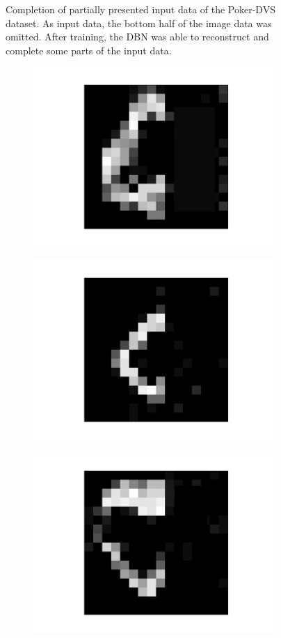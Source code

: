 \begin{figure}[h!]
\begin{subfigure}{.25\textwidth}
  		\label{fig:sub1}
	\end{subfigure}%
	\caption[Completion of partially presented input data of the Poker-DVS dataset.]{Completion of partially presented input data of the Poker-DVS dataset. As input data, the bottom half of the image data was omitted. After training, the DBN was able to reconstruct and complete some parts of the input data.}
	\label{fig:pokercompl}
\end{figure}


\begin{figure}[h!]
	\centering
	\begin{subfigure}{.25\textwidth}
  		\centering
  		\includegraphics[width=.6\linewidth]{imgs/poker/compl13.png}
  		\label{fig:sub1}
	\end{subfigure}%
	\begin{subfigure}{.25\textwidth}
  		\centering
  		\includegraphics[width=.6\linewidth]{imgs/poker/compl23.png}
  		\label{fig:sub1}
	\end{subfigure}%
	\begin{subfigure}{.25\textwidth}
  		\centering
  		\includegraphics[width=.6\linewidth]{imgs/poker/compl33.png}

\end{subfigure}
\end{figure}
